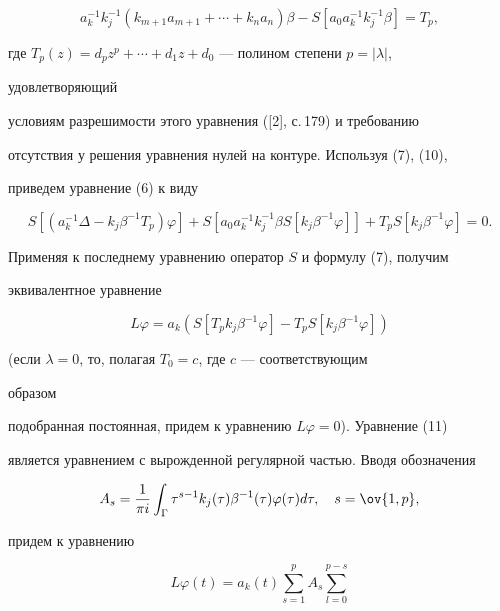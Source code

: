\begin{pf}
\begin{equation}
a^{-1}_k k^{-1}_j(k_{m+1}a_{m+1}+\dotsb+k_n a_n)\beta- 


S[a_0a^{-1}_k k^{-1}_j\beta]=T_p, 


\end{equation}


где $T_p(z)=d_p z^p+\dotsb+d_1z+d_0$ --- полином степени $p=|\lambda|$, 


удовлетворяющий 


условиям разрешимости этого уравнения ([2], с.\,179) и требованию 


отсутствия у решения уравнения нулей на контуре. Используя (7), (10), 


приведем уравнение (6) к виду 


$$ 


S[(a^{-1}_k\Delta-k_j\beta^{-1}T_p)\varphi]+ 


S[a_0a^{-1}_k k^{-1}_j\beta S[k_j\beta^{-1}\varphi]]+ 


T_p S[k_j\beta^{-1}\varphi]=0. 


$$ 


Применяя к последнему уравнению оператор $S$ и формулу (7), получим 


эквивалентное уравнение 


\begin{equation} 


L\varphi=a_k(S[T_p k_j\beta^{-1}\varphi]- 


T_p S[k_j\beta^{-1}\varphi]) 


\end{equation} 


(если $\lambda=0$, то, полагая $T_0=c$, где $c$ --- соответствующим 


образом 


подобранная постоянная, придем к уравнению $L\varphi=0$). Уравнение (11) 


является уравнением с вырожденной регулярной частью. Вводя обозначения 


\begin{equation} 


A_s=\frac{1}{\pi i}\int_\Gamma \tau^{s-1}k_j(\tau) 


\beta^{-1}(\tau)\varphi(\tau)d\tau,\quad s=\ov{1,p}, 


\end{equation} 


придем к уравнению 


\begin{equation} 


L\varphi(t)=a_k(t)\sum^p_{s=1}A_s \sum^{p-s}_{l=0} 



\end{equation}
\end{pf}
